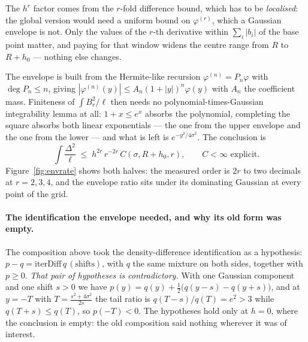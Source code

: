 The $h^{r}$ factor comes from the $r$-fold difference bound, which has to be
\emph{localised}: the global version would need a uniform bound on $\varphi^{(r)}$, which a
Gaussian envelope is not. Only the values of the $r$-th derivative within
$\sum_{i}|b_{i}|$ of the base point matter, and paying for that window widens the centre
range from $R$ to $R+h_{0}$ --- nothing else changes.

The envelope is built from the Hermite-like recursion $\varphi^{(n)}=P_{n}\varphi$ with
$\deg P_{n}\le n$, giving $|\varphi^{(n)}(y)|\le A_{n}(1+|y|)^{n}\varphi(y)$ with $A_{n}$
the coefficient mass. Finiteness of $\int B_{r}^{2}/\ell$ then needs no
polynomial-times-Gaussian integrability lemma at all: $1+x\le e^{x}$ absorbs the
polynomial, completing the square absorbs both linear exponentials --- the one from the
upper envelope and the one from the lower --- and what is left is $e^{-y^{2}/4\sigma^{2}}$.
The conclusion is
\[
\int \frac{\Delta^{2}}{\ell}\;\le\;h^{2r}\,r^{-2r}\,C(\sigma,R+h_{0},r),
\qquad C<\infty \text{ explicit.}
\]
Figure~\ref{fig:envrate} shows both halves: the measured order is $2r$ to two decimals at
$r=2,3,4$, and the envelope ratio sits under its dominating Gaussian at every point of the
grid. \NUM{}


\paragraph{The identification the envelope needed, and why its old form was empty.}
The composition above took the density-difference identification as a hypothesis:
$p-q=\mathrm{iterDiff}\,q\,(\text{shifts})$, with $q$ the same mixture on both sides,
together with $p\ge0$. \emph{That pair of hypotheses is contradictory.} With one Gaussian
component and one shift $s>0$ we have $p(y)=q(y)+\tfrac12\bigl(q(y-s)-q(y+s)\bigr)$, and at
$y=-T$ with $T=\frac{s^{2}+4\sigma^{2}}{2s}$ the tail ratio is $q(T-s)/q(T)=e^{2}>3$ while
$q(T+s)\le q(T)$, so $p(-T)<0$. The hypotheses hold only at $h=0$, where the conclusion is
empty: the old composition said nothing wherever it was of interest.

